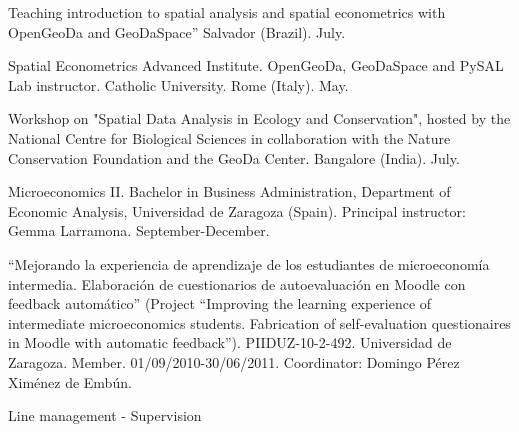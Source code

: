 \documentclass[12pt,2up]{article}
\begin{document}
\begin{cv}{}
\begin{cvlist}{Teaching}
        introduction to spatial analysis and spatial econometrics with OpenGeoDa
        and GeoDaSpace''
        Salvador (Brazil). July.
    \item[] Spatial Econometrics Advanced Institute. OpenGeoDa, GeoDaSpace and
        PySAL Lab instructor.
        Catholic University. Rome (Italy). May.
    \item[2009] Workshop on "Spatial Data Analysis in Ecology and Conservation",
        hosted by the National Centre for Biological Sciences in collaboration
        with the Nature Conservation Foundation and the GeoDa Center. Bangalore
        (India). July.

\item[\textbf{Assistantship}]
    \item[2010] Microeconomics II. Bachelor in Business Administration,
        Department of Economic Analysis, Universidad de Zaragoza (Spain).
        Principal instructor: Gemma Larramona. September-December.
    \item[2010] ``Mejorando la experiencia de aprendizaje de los estudiantes
        de microeconom\'{i}a intermedia. Elaboraci\'{o}n de cuestionarios de
        autoevaluaci\'{o}n en Moodle con feedback autom\'{a}tico'' (Project
        ``Improving the learning experience of intermediate microeconomics
        students. Fabrication of self-evaluation questionaires in Moodle
        with automatic feedback''). PIIDUZ-10-2-492.
        Universidad de Zaragoza. Member. 01/09/2010-30/06/2011.
        Coordinator: Domingo P\'{e}rez Xim\'{e}nez de Emb\'{u}n.


 
\end{cvlist}
\begin{cvlist}{Line management - Supervision}






\end{cvlist}
\end{cv}
\end{document}
